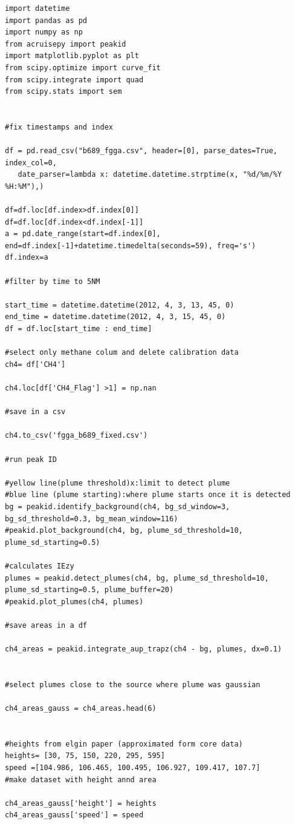 \documentclass[12pt]{article}
\begin{document}
\begin{lstlisting}
import datetime
import pandas as pd
import numpy as np
from acruisepy import peakid
import matplotlib.pyplot as plt 
from scipy.optimize import curve_fit
from scipy.integrate import quad 
from scipy.stats import sem 


#fix timestamps and index

df = pd.read_csv("b689_fgga.csv", header=[0], parse_dates=True, index_col=0,
   date_parser=lambda x: datetime.datetime.strptime(x, "%d/%m/%Y %H:%M"),)

df=df.loc[df.index>df.index[0]]
df=df.loc[df.index<df.index[-1]]
a = pd.date_range(start=df.index[0], end=df.index[-1]+datetime.timedelta(seconds=59), freq='s')
df.index=a

#filter by time to 5NM

start_time = datetime.datetime(2012, 4, 3, 13, 45, 0)
end_time = datetime.datetime(2012, 4, 3, 15, 45, 0)
df = df.loc[start_time : end_time]

#select only methane colum and delete calibration data 
ch4= df['CH4']

ch4.loc[df['CH4_Flag'] >1] = np.nan

#save in a csv

ch4.to_csv('fgga_b689_fixed.csv')

#run peak ID 

#yellow line(plume threshold)x:limit to detect plume
#blue line (plume starting):where plume starts once it is detected
bg = peakid.identify_background(ch4, bg_sd_window=3, bg_sd_threshold=0.3, bg_mean_window=116)
#peakid.plot_background(ch4, bg, plume_sd_threshold=10, plume_sd_starting=0.5)

#calculates IEzy
plumes = peakid.detect_plumes(ch4, bg, plume_sd_threshold=10, plume_sd_starting=0.5, plume_buffer=20)
#peakid.plot_plumes(ch4, plumes)

#save areas in a df

ch4_areas = peakid.integrate_aup_trapz(ch4 - bg, plumes, dx=0.1)


#select plumes close to the source where plume was gaussian 

ch4_areas_gauss = ch4_areas.head(6)


#heights from elgin paper (approximated form core data)
heights= [30, 75, 150, 220, 295, 595]
speed =[104.986, 106.465, 100.495, 106.927, 109.417, 107.7]
#make dataset with height annd area 

ch4_areas_gauss['height'] = heights
ch4_areas_gauss['speed'] = speed


\end{lstlisting}
\end{document}
